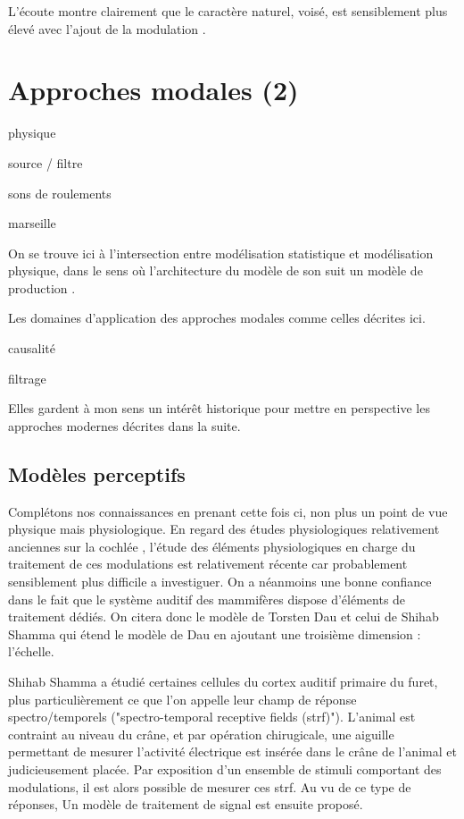 L'écoute montre clairement que le caractère naturel, voisé, est sensiblement plus élevé avec l'ajout de la modulation .


\section{Approches modales (2)}

physique

source / filtre

sons de roulements \cite{LagrangeTasslp10}

marseille \cite{conan2014synthesis}

On se trouve ici à l'intersection entre modélisation statistique et modélisation physique, dans le sens où l'architecture du modèle de son suit un modèle de production .

Les domaines d'application des approches modales comme celles décrites ici.

causalité

filtrage

Elles gardent à mon sens un intérêt historique pour mettre en perspective les approches modernes décrites dans la suite.

\subsection{Modèles perceptifs}

Complétons nos connaissances en prenant cette fois ci, non plus un point de vue physique mais physiologique. En regard des études physiologiques relativement anciennes sur la cochlée \cite{}, l'étude des éléments physiologiques en charge du traitement de ces modulations est relativement récente car probablement sensiblement plus difficile a investiguer. On a néanmoins une bonne confiance dans le fait que le système auditif des mammifères dispose d'éléments de traitement dédiés. On citera donc le modèle de Torsten Dau \cite{dau1997modeling} et celui de Shihab Shamma \cite{fritz2003rapid} qui étend le modèle de Dau en ajoutant une troisième dimension : l'échelle.

Shihab Shamma a étudié certaines cellules du cortex auditif primaire du furet, plus particulièrement ce que l'on appelle leur champ de réponse spectro/temporels ("spectro-temporal receptive fields (strf)"). L'animal est contraint au niveau du crâne, et par opération chirugicale, une aiguille permettant de mesurer l'activité électrique est insérée dans le crâne de l'animal et judicieusement placée. Par exposition d'un ensemble de stimuli comportant des modulations, il est alors possible de mesurer ces strf. Au vu de ce type de réponses, Un modèle de traitement de signal est ensuite proposé.

